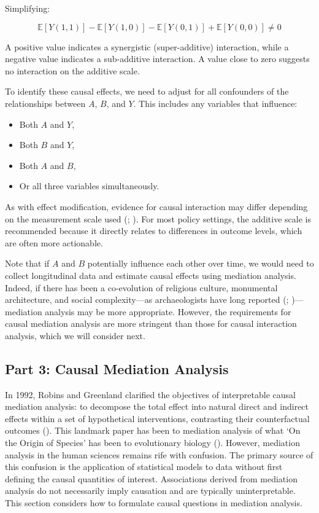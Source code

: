 \documentclass[
  single column]{article}
\providecommand{\tightlist}{%
  \setlength{\itemsep}{0pt}\setlength{\parskip}{0pt}}\usepackage{longtable,booktabs,array}
\begin{document}
Simplifying:

\[
\mathbb{E}[Y(1,1)] - \mathbb{E}[Y(1,0)] - \mathbb{E}[Y(0,1)] + \mathbb{E}[Y(0,0)] \neq 0
\]

A positive value indicates a synergistic (super-additive) interaction,
while a negative value indicates a sub-additive interaction. A value
close to zero suggests no interaction on the additive scale.

To identify these causal effects, we need to adjust for all confounders
of the relationships between \(A\), \(B\), and \(Y\). This includes any
variables that influence:

\begin{itemize}
\tightlist
\item
  Both \(A\) and \(Y\),
\item
  Both \(B\) and \(Y\),
\item
  Both \(A\) and \(B\),
\item
  Or all three variables simultaneously.
\end{itemize}

As with effect modification, evidence for causal interaction may differ
depending on the measurement scale used
(;
). For most
policy settings, the additive scale is recommended because it directly
relates to differences in outcome levels, which are often more
actionable.

Note that if \(A\) and \(B\) potentially influence each other over time,
we would need to collect longitudinal data and estimate causal effects
using mediation analysis. Indeed, if there has been a co-evolution of
religious culture, monumental architecture, and social complexity---as
archaeologists have long reported (; )---mediation analysis may be more appropriate. However, the
requirements for causal mediation analysis are more stringent than those
for causal interaction analysis, which we will consider next.

\subsection{Part 3: Causal Mediation Analysis}\label{id-sec-3}

In 1992, Robins and Greenland clarified the objectives of interpretable
causal mediation analysis: to decompose the total effect into natural
direct and indirect effects within a set of hypothetical interventions,
contrasting their counterfactual outcomes
(). This landmark
paper has been to mediation analysis of what `On the Origin of Species'
has been to evolutionary biology
(). However, mediation
analysis in the human sciences remains rife with confusion. The primary
source of this confusion is the application of statistical models to
data without first defining the causal quantities of interest.
Associations derived from mediation analysis do not necessarily imply
causation and are typically uninterpretable. This section considers how
to formulate causal questions in mediation analysis.
\end{document}
